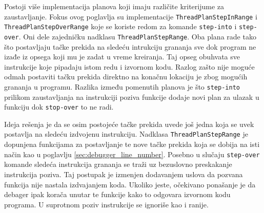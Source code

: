 \documentclass[12pt,oneside]{memoir}
\begin{document}
Postoji više implementacija planova koji imaju različite kriterijume za zaustavljanje.
Fokus ovog poglavlja su implementacije \verb|ThreadPlanStepInRange| i \verb|ThreadPlanStepOverRange| koje se koriste redom za komande \verb|step-into| i \verb|step-over|.
Oni dele zajedničku nadklasu \verb|ThreadPlanStepRange|.
Oba plana rade tako što postavljaju tačke prekida na sledeću intrukciju grananja sve dok program ne izađe iz opsega koji mu je zadat u vreme kreiranja.
Taj opseg obuhvata sve instrukcije koje pipadaju istom redu i izvornom kodu.
Razlog zašto nije moguće odmah postaviti tačku prekida direktno na konačnu lokaciju je zbog mogućih grananja u programu.
Razlika između pomenutih planova je što \verb|step-into| prilikom zaustavljanja na instrukciji poziva funkcije dodaje novi plan za ulazak u funkciju dok \verb|stop-over| to ne radi.

Ideja rešenja je da se osim postojeće tačke prekida uvede još jedna koja se uvek postavlja na sledeću izdvojenu instrukciju.
Nadklasa \verb|ThreadPlanStepRange| je dopunjena funkcijama za postavljanje te nove tačke prekida koja se dobija na isti način kao u poglavlju \ref{sec:debugger_line_number}.
Posebno u slučaju \verb|step-over| komande sledeća instrukcija grananja se traži uz bezuslovno preskakanje instrukcija poziva.
Taj postupak je izmenjen dodavanjem uslova da pozvana funkcija nije nastala izdvajanjem koda.
Ukoliko jeste, očekivano ponašanje je da debager ipak korača unutar te funkcije kako to odgovara izvornom kodu programa.
U suprotnom poziv instrukcije se ignoriše kao i ranije.
\end{document}
